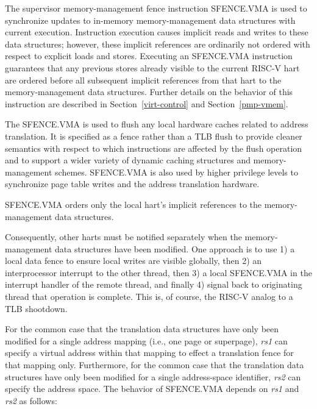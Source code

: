 The supervisor memory-management fence instruction SFENCE.VMA is used to
synchronize updates to in-memory memory-management data structures with
current execution.  Instruction execution causes implicit reads and writes to
these data structures; however, these implicit references are ordinarily not
ordered with respect to explicit loads and stores.  Executing
an SFENCE.VMA instruction guarantees that any previous stores already visible
to the current RISC-V hart are ordered before all subsequent implicit references
from that hart to the memory-management data structures.
Further details on the behavior of this instruction are
described in Section~\ref{virt-control} and Section~\ref{pmp-vmem}.

\begin{commentary}
The SFENCE.VMA is used to flush any local hardware caches related to
address translation.  It is specified as a fence rather than a TLB
flush to provide cleaner semantics with respect to which instructions
are affected by the flush operation and to support a wider variety of
dynamic caching structures and memory-management schemes.  SFENCE.VMA
is also used by higher privilege levels to synchronize page table
writes and the address translation hardware.
\end{commentary}

SFENCE.VMA orders only the local hart's implicit references to the
memory-management data structures.

\begin{commentary}
Consequently, other harts must be notified separately when the
memory-management data structures have been modified.
One approach is to use 1)
a local data fence to ensure local writes are visible globally, then
2) an interprocessor interrupt to the other thread, then 3) a local
SFENCE.VMA in the interrupt handler of the remote thread, and finally
4) signal back to originating thread that operation is complete.  This
is, of course, the RISC-V analog to a TLB shootdown.
\end{commentary}

For the common case that the translation data structures have only been
modified for a single address mapping (i.e., one page or superpage), {\em rs1}
can specify a virtual address within that mapping to effect a translation
fence for that mapping only.  Furthermore, for the common case that the
translation data structures have only been modified for a single address-space
identifier, {\em rs2} can specify the address space.  The behavior of
SFENCE.VMA depends on {\em rs1} and {\em rs2} as follows:

